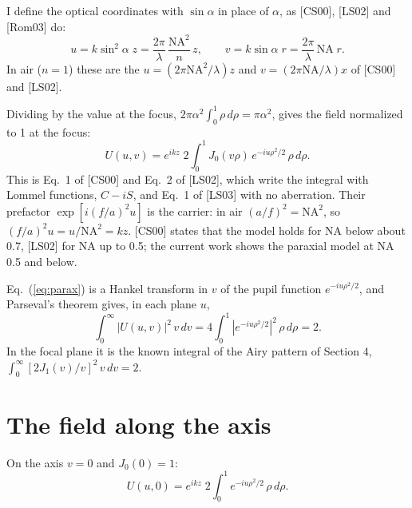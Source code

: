 \documentclass[11pt]{article}
\begin{document}
 I define the optical coordinates with $\sin\alpha$ in place of $\alpha$, as [CS00], [LS02] and [Rom03] do:
\begin{equation}u = k\sin^2\!\alpha\;z = \frac{2\pi}{\lambda}\,\frac{\mathrm{NA}^2}{n}\,z,\qquad
v = k\sin\alpha\;r = \frac{2\pi}{\lambda}\,\mathrm{NA}\;r .\end{equation}
In air ($n = 1$) these are the $u = (2\pi\mathrm{NA}^2/\lambda)z$ and $v = (2\pi\mathrm{NA}/\lambda)x$ of [CS00] and
[LS02].

 Dividing by the value at the focus, $2\pi\alpha^2\int_0^1\rho\,d\rho = \pi\alpha^2$, gives the field
normalized to 1 at the focus:
\begin{equation}U(u,v) = e^{ikz}\;2\int_0^1 J_0(v\rho)\,e^{-iu\rho^2/2}\,\rho\,d\rho .\label{eq:parax}\end{equation}
This is Eq.~1 of [CS00] and Eq.~2 of [LS02], which write the integral with Lommel functions, $C - iS$, and
Eq.~1 of [LS03] with no aberration. Their prefactor $\exp[i(f/a)^2u]$ is the carrier: in air $(a/f)^2 = \mathrm{NA}^2$,
so $(f/a)^2u = u/\mathrm{NA}^2 = kz$. [CS00] states that the model holds for NA below about 0.7, [LS02] for NA up
to 0.5; the current work shows the paraxial model at NA 0.5 and below.

 Eq.~(\ref{eq:parax}) is a Hankel transform in $v$ of the pupil function $e^{-iu\rho^2/2}$, and Parseval's
theorem gives, in each plane $u$,
\begin{equation}\int_0^\infty|U(u,v)|^2\,v\,dv = 4\int_0^1|e^{-iu\rho^2/2}|^2\,\rho\,d\rho = 2 .\end{equation}
In the focal plane it is the known integral of the Airy pattern of Section 4, $\int_0^\infty[2J_1(v)/v]^2\,v\,dv = 2$.


\section{The field along the axis}
 On the axis $v = 0$ and $J_0(0) = 1$:
\begin{equation}U(u,0) = e^{ikz}\;2\int_0^1 e^{-iu\rho^2/2}\,\rho\,d\rho .\end{equation}
\end{document}
